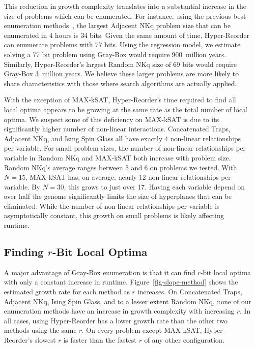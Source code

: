 \documentclass[runningheads,a4paper]{llncs}
\begin{document}
This reduction in growth complexity translates into a substantial increase in the size of problems
which can be enumerated. For instance, using the previous best enumeration methods~\cite{ochoa:2015:crossovernetworks},
the largest Adjacent NKq problem size that can be enumerated in 4 hours is 34 bits. Given the same amount of time,
Hyper-Reorder can enumerate problems with 77 bits. Using the regression model, we estimate solving
a 77 bit problem using Gray-Box would require 900~million years. Similarly, Hyper-Reorder's largest
Random NKq size of 69 bits would require Gray-Box 3~million years. We believe these larger problems
are more likely to share characteristics with those where search algorithms are actually applied.

With the exception of MAX-kSAT, Hyper-Reorder's time required to find all local optima
appears to be growing at the same rate as the total number of local optima. We suspect
some of this deficiency on MAX-kSAT is due to its significantly higher number of non-linear
interactions. Concatenated Traps, Adjacent NKq, and Ising Spin Glass all have exactly 4
non-linear relationships per variable. For small problem sizes,
the number of non-linear relationships per variable in
Random NKq and MAX-kSAT both increase with problem
size. Random NKq's average ranges between 5 and 6 on problems we tested.
With $N=15$, MAX-kSAT has, on average, nearly
12 non-linear relationships per variable. By $N=30$, this grows to just over 17. Having each
variable depend on over half the genome significantly limits the size of hyperplanes that
can be eliminated. While the number of non-linear relationships per variable
is asymptotically constant, this growth on small problems is likely affecting runtime.


\subsection{Finding $r$-Bit Local Optima}
\label{sec-r-bit}
A major advantage of Gray-Box enumeration is that it can find $r$-bit local optima
with only a constant increase in runtime. Figure~\ref{fig-slope-method}
shows the estimated growth rate for each method as $r$ increases. On Concatenated Traps,
Adjacent NKq, Ising Spin Glass, and to a lesser extent Random NKq, none of our enumeration
methods have an increase in growth complexity with increasing $r$. In all cases, using Hyper-Reorder
has a lower growth rate than the other two methods using the same $r$. On every problem
except MAX-kSAT, Hyper-Reorder's slowest $r$ is faster than the fastest $r$
of any other configuration.
\end{document}
